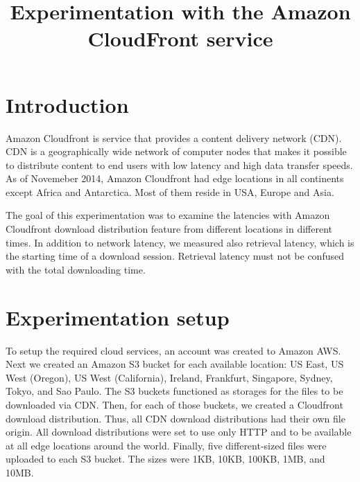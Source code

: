 \documentclass[conference]{IEEEtran}
\begin{document}
%
\title{Experimentation with the Amazon CloudFront service}


\author{
\and
{}
}


\maketitle

\IEEEpeerreviewmaketitle



\section{Introduction}
Amazon Cloudfront is service that provides a content delivery network (CDN). CDN is a geographically wide network of computer nodes that makes it possible to distribute content to end users with low latency and high data transfer speeds. As of Novemeber 2014, Amazon Cloudfront had edge locations in all continents except Africa and Antarctica. Most of them reside in USA, Europe and Asia. \cite{cloudfront_product_details}

The goal of this experimentation was to examine the latencies with Amazon Cloudfront download distribution feature from different locations in different times. In addition to network latency, we measured also retrieval latency, which is the starting time of a download session. Retrieval latency must not be confused with the total downloading time.

\section{Experimentation setup}
To setup the required cloud services, an account was created to Amazon AWS. Next we created an Amazon S3 bucket for each available location: US East, US West (Oregon), US West (California), Ireland, Frankfurt, Singapore, Sydney, Tokyo, and Sao Paulo. The S3 buckets functioned as storages for the files to be downloaded via CDN. Then, for each of those buckets, we created a Cloudfront download distribution. Thus, all CDN download distributions had their own file origin. All download distributions were set to use only HTTP and to be available at all edge locations around the world. Finally, five different-sized files were uploaded to each S3 bucket. The sizes were 1KB, 10KB, 100KB, 1MB, and 10MB.
\end{document}
